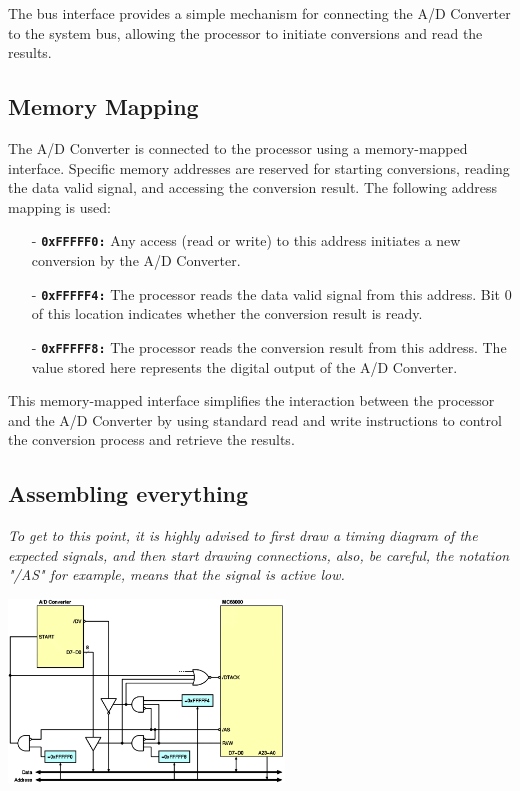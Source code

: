 The bus interface provides a simple mechanism for connecting the A/D Converter to the system bus, allowing the processor to initiate conversions and read the results.

\subsection{Memory Mapping}
The A/D Converter is connected to the processor using a memory-mapped interface. Specific memory addresses are reserved for starting conversions, reading the data valid signal, and accessing the conversion result. The following address mapping is used:
\begin{itemize}
    \item[-] \texttt{\textbf{0xFFFFF0:}} Any access (read or write) to this address initiates a new conversion by the A/D Converter.
    \item[-] \texttt{\textbf{0xFFFFF4:}} The processor reads the data valid signal from this address. Bit 0 of this location indicates whether the conversion result is ready.
    \item[-] \texttt{\textbf{0xFFFFF8:}} The processor reads the conversion result from this address. The value stored here represents the digital output of the A/D Converter.
\end{itemize}

This memory-mapped interface simplifies the interaction between the processor and the A/D Converter by using standard read and write instructions to control the conversion process and retrieve the results.
\newpage \subsection{Assembling everything}
\textit{To get to this point, it is highly advised to first draw a timing diagram of the expected signals, and then start drawing connections, also, be careful, the notation "/AS" for example, means that the signal is active low.}
\begin{center}
    \includegraphics[width=0.55\textwidth]{chapters/chapter2b/images/adc.png}
\end{center}

